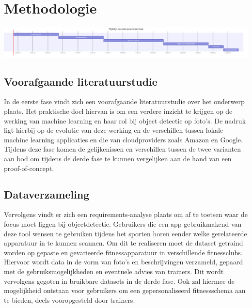 \section{Methodologie}
\label{sec:methodologie}
\includegraphics[width=1\textwidth]{images/ganttChart}

\subsection{Voorafgaande literatuurstudie}
\label{subsec:literature-study}
In de eerste fase vindt zich een voorafgaande literatuurstudie over het onderwerp plaats. %
Het praktische doel hiervan is om een verdere inzicht te krijgen op de werking van machine learning en haar rol bij object detectie op foto's.
De nadruk ligt hierbij op de evolutie van deze werking en de verschillen tussen lokale machine learning applicaties en die van cloudproviders zoals Amazon en Google.
Tijdens deze fase komen de gelijkenissen en verschillen tussen de twee varianten aan bod om tijdens de derde fase te kunnen vergelijken aan de hand van een proof-of-concept.

\subsection{Dataverzameling}
\label{subsec:dataverzameling}
Vervolgens vindt er zich een requirements-analyse plaats om af te toetsen waar de focus moet liggen bij objectdetectie. %
Gebruikers die een app gebruikmakend van deze tool wensen te gebruiken tijdens het sporten horen eender welke gerelateerde apparatuur in te kunnen scannen.
Om dit te realiseren moet de dataset getraind worden op gepaste en gevarieerde fitnessapparatuur in verschillende fitnessclubs.
Hiervoor wordt data in de vorm van foto's en beschrijvingen verzameld, gepaard met de gebruiksmogelijkheden en eventuele advies van trainers.
Dit wordt vervolgens gegoten in bruikbare datasets in de derde fase.
Ook zal hiermee de mogelijkheid ontstaan voor gebruikers om een gepersonaliseerd fitnessschema aan te bieden, deels vooropgesteld door trainers.


